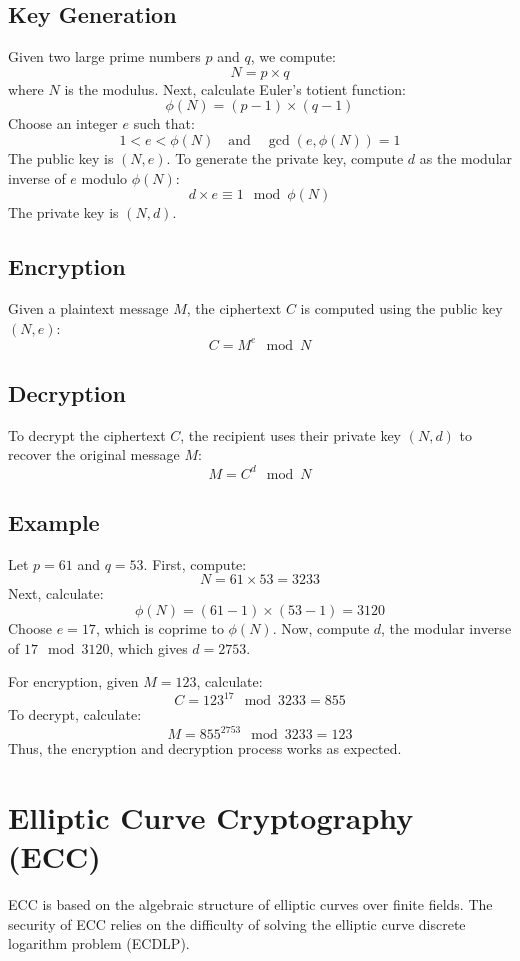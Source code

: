 \documentclass[12pt]{report}
\numberwithin{equation}{chapter}
\begin{document}
\subsection*{Key Generation}
Given two large prime numbers \( p \) and \( q \), we compute:
\[
N = p \times q
\]
where \( N \) is the modulus. Next, calculate Euler's totient function:
\[
\phi(N) = (p - 1) \times (q - 1)
\]
Choose an integer \( e \) such that:
\[
1 < e < \phi(N) \quad \text{and} \quad \gcd(e, \phi(N)) = 1
\]
The public key is \( (N, e) \). To generate the private key, compute \( d \) as the modular inverse of \( e \) modulo \( \phi(N) \):
\[
d \times e \equiv 1 \mod \phi(N)
\]
The private key is \( (N, d) \).

\subsection*{Encryption}
Given a plaintext message \( M \), the ciphertext \( C \) is computed using the public key \( (N, e) \):
\[
C = M^e \mod N
\]

\subsection*{Decryption}
To decrypt the ciphertext \( C \), the recipient uses their private key \( (N, d) \) to recover the original message \( M \):
\[
M = C^d \mod N
\]

\subsection*{Example}
Let \( p = 61 \) and \( q = 53 \). First, compute:
\[
N = 61 \times 53 = 3233
\]
Next, calculate:
\[
\phi(N) = (61 - 1) \times (53 - 1) = 3120
\]
Choose \( e = 17 \), which is coprime to \( \phi(N) \). Now, compute \( d \), the modular inverse of \( 17 \mod 3120 \), which gives \( d = 2753 \).

For encryption, given \( M = 123 \), calculate:
\[
C = 123^{17} \mod 3233 = 855
\]
To decrypt, calculate:
\[
M = 855^{2753} \mod 3233 = 123
\]
Thus, the encryption and decryption process works as expected.


\section{Elliptic Curve Cryptography (ECC)}

ECC is based on the algebraic structure of elliptic curves over finite fields. The security of ECC relies on the difficulty of solving the elliptic curve discrete logarithm problem (ECDLP).
\end{document}
